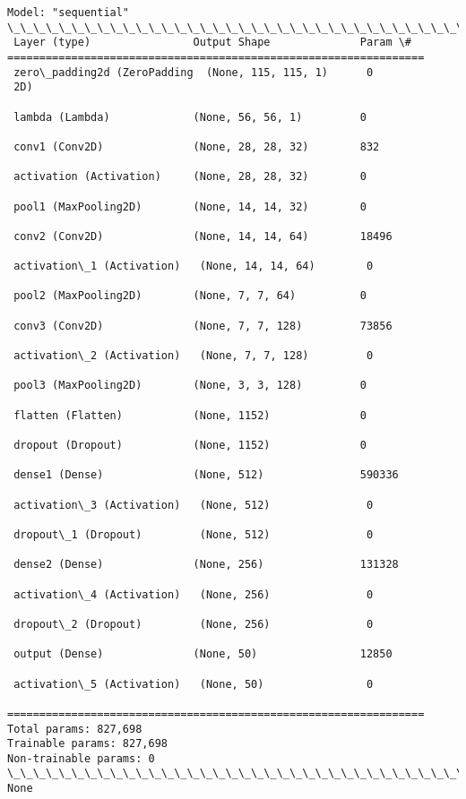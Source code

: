 \documentclass[11pt]{article}
\begin{document}
    \begin{Verbatim}[commandchars=\\\{\}]
Model: "sequential"
\_\_\_\_\_\_\_\_\_\_\_\_\_\_\_\_\_\_\_\_\_\_\_\_\_\_\_\_\_\_\_\_\_\_\_\_\_\_\_\_\_\_\_\_\_\_\_\_\_\_\_\_\_\_\_\_\_\_\_\_\_\_\_\_\_
 Layer (type)                Output Shape              Param \#
=================================================================
 zero\_padding2d (ZeroPadding  (None, 115, 115, 1)      0
 2D)

 lambda (Lambda)             (None, 56, 56, 1)         0

 conv1 (Conv2D)              (None, 28, 28, 32)        832

 activation (Activation)     (None, 28, 28, 32)        0

 pool1 (MaxPooling2D)        (None, 14, 14, 32)        0

 conv2 (Conv2D)              (None, 14, 14, 64)        18496

 activation\_1 (Activation)   (None, 14, 14, 64)        0

 pool2 (MaxPooling2D)        (None, 7, 7, 64)          0

 conv3 (Conv2D)              (None, 7, 7, 128)         73856

 activation\_2 (Activation)   (None, 7, 7, 128)         0

 pool3 (MaxPooling2D)        (None, 3, 3, 128)         0

 flatten (Flatten)           (None, 1152)              0

 dropout (Dropout)           (None, 1152)              0

 dense1 (Dense)              (None, 512)               590336

 activation\_3 (Activation)   (None, 512)               0

 dropout\_1 (Dropout)         (None, 512)               0

 dense2 (Dense)              (None, 256)               131328

 activation\_4 (Activation)   (None, 256)               0

 dropout\_2 (Dropout)         (None, 256)               0

 output (Dense)              (None, 50)                12850

 activation\_5 (Activation)   (None, 50)                0

=================================================================
Total params: 827,698
Trainable params: 827,698
Non-trainable params: 0
\_\_\_\_\_\_\_\_\_\_\_\_\_\_\_\_\_\_\_\_\_\_\_\_\_\_\_\_\_\_\_\_\_\_\_\_\_\_\_\_\_\_\_\_\_\_\_\_\_\_\_\_\_\_\_\_\_\_\_\_\_\_\_\_\_
None
    \end{Verbatim}
\end{document}
